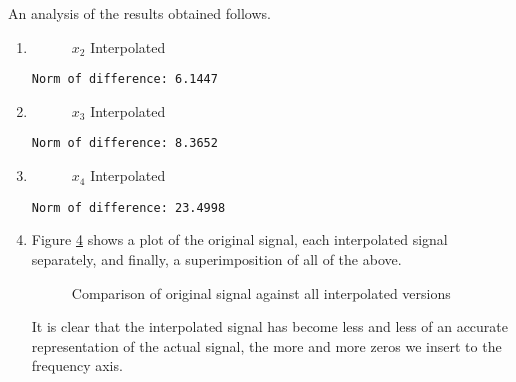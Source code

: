 \documentclass{article}[a4paper]
\begin{document}
	An analysis of the results obtained follows.
	\newpage
	\begin{enumerate}[label=(\alph*)]
		\item \phantom{a}
		\begin{figure}[H]
			\centering
			\caption{$x_2$ Interpolated}
			\label{x2_interp}
		\end{figure}
		
		\begin{lstlisting}[caption={Code output, $\rVert x_2 - x \lVert$}, label=x2_x_norm]
Norm of difference: 6.1447
		\end{lstlisting}
		
		\item \phantom{a}
		\begin{figure}[H]
			\centering
			\caption{$x_3$ Interpolated}
			\label{x3_interp}
		\end{figure}
		\newpage
		\begin{lstlisting}[caption={Code output, $\rVert x_3 - x \lVert$}, label=x3_x_norm]
Norm of difference: 8.3652
		\end{lstlisting}
		
		\item \phantom{a}
		\begin{figure}[H]
			\centering
			\caption{$x_4$ Interpolated}
			\label{x4_interp}
		\end{figure}
		
		\begin{lstlisting}[caption={Code output, $\rVert x_4 - x \lVert$}, label=x4_x_norm]
Norm of difference: 23.4998
		\end{lstlisting}
		
		\item Figure \ref{all_compare} shows a plot of the original signal, each interpolated signal separately, and finally, a superimposition of all of the above.
		
		\begin{figure}[H]
			\centering
			\caption{Comparison of original signal against all interpolated versions}
			\label{all_compare}
		\end{figure}
		
		It is clear that the interpolated signal has become less and less of an accurate representation of the actual signal, the more and more zeros we insert to the frequency axis.
		

\end{enumerate}
\end{document}
